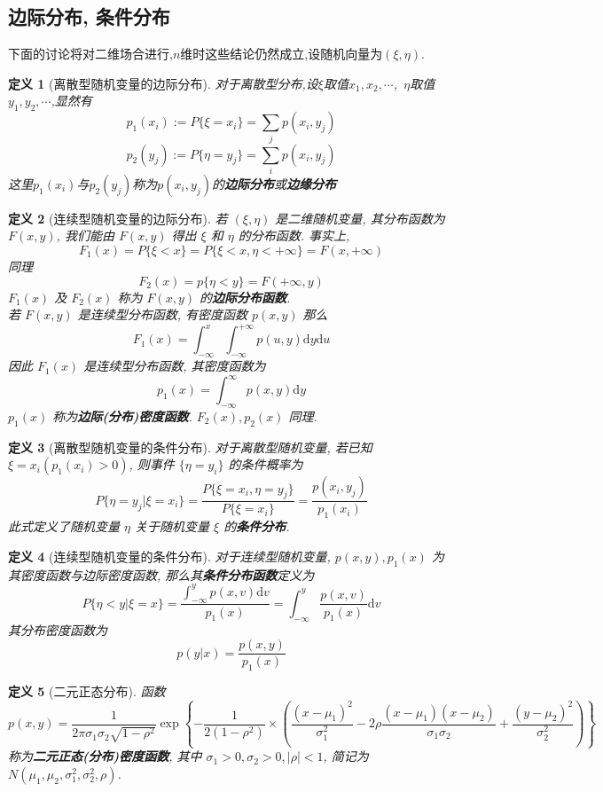 \documentclass[12pt,a4paper]{article}
\newtheorem{definition}{定义}[subsection] %
\begin{document}
\subsection{边际分布, 条件分布}
下面的讨论将对二维场合进行,$n$维时这些结论仍然成立,设随机向量为$(\xi,\eta)$.
\begin{definition}[离散型随机变量的边际分布]
    对于离散型分布,设$\xi$取值$x_1,x_2,\cdots$,\ $\eta$取值$y_1,y_2,\cdots$,显然有
    \[p_1(x_i):=P\{\xi = x_i\} =\sum_{j}p(x_i,y_j)\]
    \[p_2(y_j):=P\{\eta = y_j\} =\sum_{i}p(x_i,y_j)\]
    这里$p_1(x_i)$与$p_2(y_j)$称为$p(x_i,y_j)$的\textbf{边际分布}或\textbf{边缘分布}
\end{definition}
\begin{definition}[连续型随机变量的边际分布]
    若 $(\xi, \eta)$ 是二维随机变量, 其分布函数为 $F(x, y)$, 我们能由 $F(x, y)$ 得出 $\xi$ 和 $\eta$ 的分布函数. 
    事实上, \[F_1(x) = P\{\xi < x \} = P\{\xi < x, \eta < +\infty\} = F(x, +\infty)\]
    同理\[F_2(x) = p\{\eta < y\} = F(+\infty, y)\]
    $F_1(x)$ 及 $F_2(x)$ 称为 $F(x, y)$ 的\textbf{边际分布函数}.\\
    若 $F(x, y)$ 是连续型分布函数, 有密度函数 $p(x, y)$ 那么\[F_1(x) = \int_{-\infty}^x \int_{-\infty}^{+\infty} p(u, y) \mathrm{d}y\mathrm{d}u\]
    因此 $F_1(x)$ 是连续型分布函数, 其密度函数为\[p_1(x) = \int_{-\infty}^{\infty} p(x,y) \mathrm{d} y\]
    $p_1(x)$ 称为\textbf{边际(分布)密度函数}. $F_2(x), p_2(x)$ 同理.
\end{definition}

\begin{definition}[离散型随机变量的条件分布]
    对于离散型随机变量, 若已知 $\xi = x_i (p_1(x_i) > 0)$, 则事件 $\{\eta = y_i\}$ 的条件概率为
    \[P\{\eta = y_j | \xi = x_i\} = \frac{P\{\xi = x_i, \eta = y_j\}}{P\{\xi = x_i \}} = \frac{p(x_i, y_j)}{p_1(x_i)}\] 
    此式定义了随机变量 $\eta$ 关于随机变量 $\xi$ 的\textbf{条件分布}.
\end{definition}
\begin{definition}[连续型随机变量的条件分布]
    对于连续型随机变量, $p(x,y),p_1(x)$ 为其密度函数与边际密度函数, 那么其\textbf{条件分布函数}定义为
    \[P\{\eta < y | \xi = x\} = \frac{\int_{-\infty}^y p(x, v) \mathrm{d}v}{p_1(x)} = \int_{-\infty}^y \frac{p(x,v)}{p_1(x)} \mathrm{d}v \]
    其分布密度函数为\[p(y|x) = \frac{p(x,y)}{p_1(x)} \]
\end{definition}

\begin{definition}[二元正态分布]
    函数\[p(x,y) = \frac{1}{2\pi \sigma_1 \sigma_2 \sqrt{1-\rho^2}}\exp\left\{ -\frac{1}{2(1-\rho^2)} \times 
    \left( \frac{(x-\mu_1)^2}{\sigma_1^2} -2\rho \frac{(x-\mu_1)(x-\mu_2)}{\sigma_1 \sigma_2} +\frac{(y-\mu_2)^2}{\sigma_2^2} \right)\right\} \]
    称为\textbf{二元正态(分布)密度函数}, 其中 $\sigma_1>0, \sigma_2>0, |\rho|<1$, 简记为 $N(\mu_1, \mu_2, \sigma_1^2, \sigma_2^2, \rho)$.
\end{definition}
\end{document}
